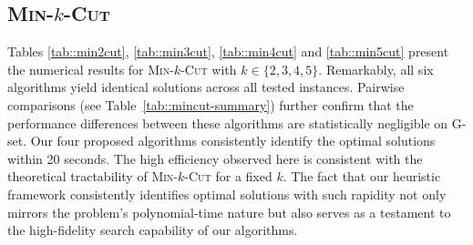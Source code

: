 \documentclass[12pt, a4paper]{article}%
\numberwithin{equation}{section}
\theoremstyle{plain}
\newcommand{\blue}{\textcolor{blue}}
\begin{document}
			
			\subsection{\textsc{Min}-$k$-\textsc{Cut}}
			
			
			

			
			Tables \ref{tab::min2cut}, \ref{tab::min3cut}, \ref{tab::min4cut} and \ref{tab::min5cut} present the numerical results for \textsc{Min}-$k$-\textsc{Cut} with $k \in \{2, 3, 4, 5\}$. Remarkably, all six algorithms yield identical solutions across all tested instances. Pairwise comparisons (see Table~\ref{tab::mincut-summary}) further confirm that the performance differences between these algorithms are statistically negligible on G-set. Our four proposed algorithms consistently identify the optimal solutions within 20 seconds. The high efficiency observed here is consistent with the theoretical tractability of \textsc{Min}-$k$-\textsc{Cut} for a fixed $k$. The fact that our heuristic framework consistently identifies optimal solutions with such rapidity not only mirrors the problem's polynomial-time nature but also serves as a testament to the high-fidelity search capability of our algorithms.
			
			
			
\end{document}
